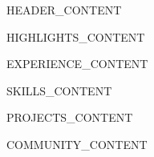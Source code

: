 \documentclass[11pt,a4paper]{article}
\begin{document}
{{HEADER_CONTENT}}

\vspace{0.5em}

\noindent%
{{HIGHLIGHTS_CONTENT}}

\vspace{1em}

{{EXPERIENCE_CONTENT}}

{{SKILLS_CONTENT}}

{{PROJECTS_CONTENT}}

{{COMMUNITY_CONTENT}}
\end{document}
